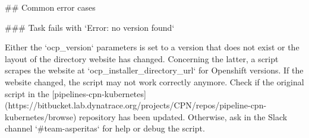 ## Common error cases

### Task fails with `Error: no version found`

Either the `ocp_version` parameters is set to a version that does not exist or the layout of the directory website has changed.
Concerning the latter, a script scrapes the website at `ocp_installer_directory_url` for Openshift versions.
If the website changed, the script may not work correctly anymore.
Check if the original script in the [pipelines-cpn-kubernetes](https://bitbucket.lab.dynatrace.org/projects/CPN/repos/pipeline-cpn-kubernetes/browse) repository has been updated.
Otherwise, ask in the Slack channel `#team-asperitas` for help or debug the script.
